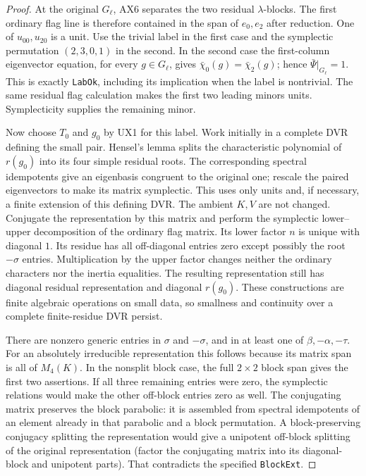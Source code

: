 \begin{proof}
At the original $G_\ell$, AX6 separates the two residual
$\lambda$-blocks.  The first ordinary flag line is therefore
contained in the span of $e_0,e_2$ after reduction.  One of
$u_{00},u_{20}$ is a unit.  Use the trivial label in the first
case and the symplectic permutation $(2,3,0,1)$ in the
second.  In the second case the first-column eigenvector
equation, for every $g\in G_\ell$, gives
$\bar\chi_0(g)=\bar\chi_2(g)$; hence
$\bar\Psi|_{G_\ell}=1$.  This is exactly
\texttt{LabOk}, including its implication when the label
is nontrivial.  The same residual flag calculation makes
the first two leading minors units.  Symplecticity supplies
the remaining minor.

Now choose $T_0$ and $g_0$ by UX1 for this label.
Work initially in a complete DVR
defining the small pair.  Hensel's lemma splits the
characteristic polynomial of $r(g_0)$ into its four simple
residual roots.  The corresponding spectral idempotents
give an eigenbasis congruent to the original one; rescale
the paired eigenvectors to make its matrix symplectic.
This uses only units and, if necessary, a finite extension
of this defining DVR.  The ambient $K,V$ are not changed.
Conjugate the representation by this matrix and perform
the symplectic lower--upper decomposition of the ordinary
flag matrix.  Its lower factor $n$ is unique with diagonal
$1$.  Its residue has all off-diagonal entries zero except
possibly the root $-\sigma$ entries.  Multiplication by
the upper factor changes neither the ordinary characters
nor the inertia equalities.  The resulting representation
still has diagonal residual representation and diagonal
$r(g_0)$.  These constructions are finite algebraic
operations on small data, so smallness and continuity
over a complete finite-residue DVR persist.

There are nonzero generic entries in $\sigma$ and
$-\sigma$, and in at least one of
$\beta,-\alpha,-\tau$.  For an absolutely irreducible
representation this follows because its matrix span is
all of $M_4(K)$.  In the nonsplit block case, the full
$2\times2$ block span gives the first two assertions.
If all three remaining entries were zero, the symplectic
relations would make the other off-block entries zero as
well.  The conjugating matrix preserves the block
parabolic: it is assembled from spectral idempotents of
an element already in that parabolic and a block
permutation.  A block-preserving conjugacy splitting the
representation would give a unipotent off-block splitting
of the original representation (factor the conjugating
matrix into its diagonal-block and unipotent parts).
That contradicts the specified \texttt{BlockExt}.


\end{proof}
